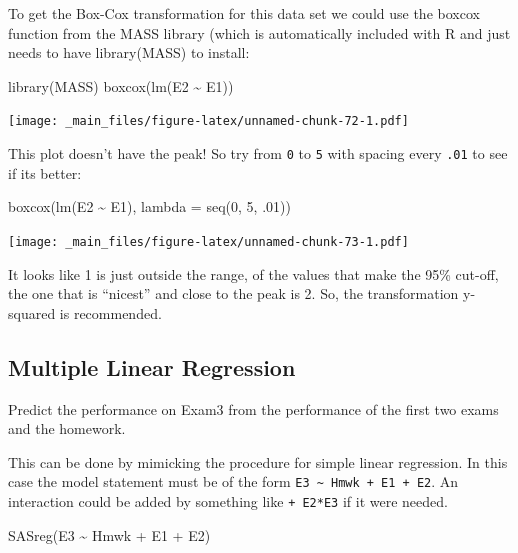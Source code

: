 \documentclass[
]{book}
\newenvironment{Shaded}{\begin{snugshade}}{\end{snugshade}}
\newcommand{\AttributeTok}[1]{\textcolor[rgb]{0.77,0.63,0.00}{#1}}
\newcommand{\DecValTok}[1]{\textcolor[rgb]{0.00,0.00,0.81}{#1}}
\newcommand{\FunctionTok}[1]{\textcolor[rgb]{0.00,0.00,0.00}{#1}}
\newcommand{\NormalTok}[1]{#1}
\newcommand{\SpecialCharTok}[1]{\textcolor[rgb]{0.00,0.00,0.00}{#1}}
\begin{document}
To get the Box-Cox transformation for this data set we could use the boxcox function from the MASS library (which is automatically included with R and just needs to have library(MASS) to install:

\begin{Shaded}
\begin{Highlighting}[]
\FunctionTok{library}\NormalTok{(MASS)}
\FunctionTok{boxcox}\NormalTok{(}\FunctionTok{lm}\NormalTok{(E2 }\SpecialCharTok{\textasciitilde{}}\NormalTok{ E1))}
\end{Highlighting}
\end{Shaded}

\texttt{[image: \_main\_files/figure-latex/unnamed-chunk-72-1.pdf]}

This plot doesn't have the peak! So try from \texttt{0} to \texttt{5} with spacing every \texttt{.01} to see if its better:

\begin{Shaded}
\begin{Highlighting}[]
\FunctionTok{boxcox}\NormalTok{(}\FunctionTok{lm}\NormalTok{(E2 }\SpecialCharTok{\textasciitilde{}}\NormalTok{ E1), }\AttributeTok{lambda =} \FunctionTok{seq}\NormalTok{(}\DecValTok{0}\NormalTok{, }\DecValTok{5}\NormalTok{, .}\DecValTok{01}\NormalTok{))}
\end{Highlighting}
\end{Shaded}

\texttt{[image: \_main\_files/figure-latex/unnamed-chunk-73-1.pdf]}

It looks like 1 is just outside the range, of the values that make the 95\% cut-off, the one that is ``nicest'' and close to the peak is 2. So, the transformation y-squared is recommended.

\hypertarget{multiple-linear-regression}{%
\subsection{Multiple Linear Regression}\label{multiple-linear-regression}}

Predict the performance on Exam3 from the performance of the first two exams and the homework.

This can be done by mimicking the procedure for simple linear regression. In this case the model statement must be of the form \texttt{E3\ \textasciitilde{}\ Hmwk\ +\ E1\ +\ E2}. An interaction could be added by something like \texttt{+\ E2*E3} if it were needed.

\begin{Shaded}
\begin{Highlighting}[]
\FunctionTok{SASreg}\NormalTok{(E3 }\SpecialCharTok{\textasciitilde{}}\NormalTok{ Hmwk }\SpecialCharTok{+}\NormalTok{ E1 }\SpecialCharTok{+}\NormalTok{ E2)}
\end{Highlighting}
\end{Shaded}
\end{document}
